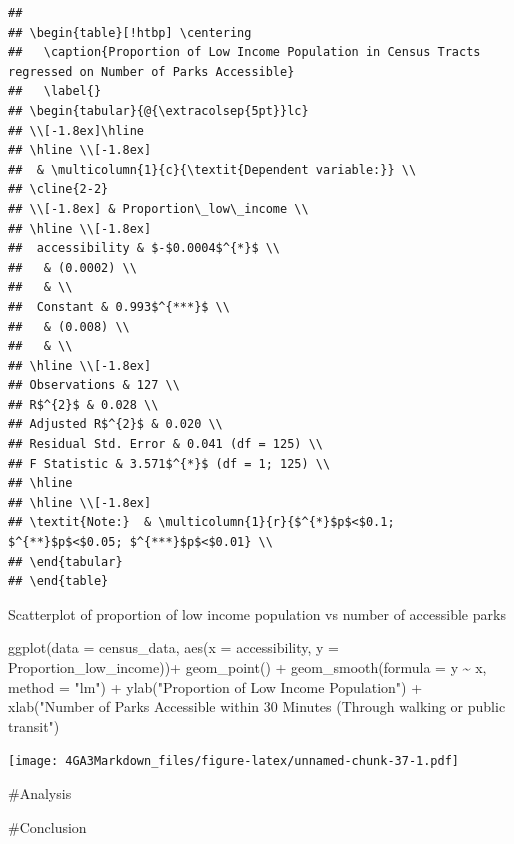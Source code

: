 \documentclass[
]{article}
\newenvironment{Shaded}{\begin{snugshade}}{\end{snugshade}}
\newcommand{\AttributeTok}[1]{\textcolor[rgb]{0.77,0.63,0.00}{#1}}
\newcommand{\FunctionTok}[1]{\textcolor[rgb]{0.00,0.00,0.00}{#1}}
\newcommand{\NormalTok}[1]{#1}
\newcommand{\SpecialCharTok}[1]{\textcolor[rgb]{0.00,0.00,0.00}{#1}}
\newcommand{\StringTok}[1]{\textcolor[rgb]{0.31,0.60,0.02}{#1}}
\begin{document}
\begin{verbatim}
## 
## \begin{table}[!htbp] \centering 
##   \caption{Proportion of Low Income Population in Census Tracts regressed on Number of Parks Accessible} 
##   \label{} 
## \begin{tabular}{@{\extracolsep{5pt}}lc} 
## \\[-1.8ex]\hline 
## \hline \\[-1.8ex] 
##  & \multicolumn{1}{c}{\textit{Dependent variable:}} \\ 
## \cline{2-2} 
## \\[-1.8ex] & Proportion\_low\_income \\ 
## \hline \\[-1.8ex] 
##  accessibility & $-$0.0004$^{*}$ \\ 
##   & (0.0002) \\ 
##   & \\ 
##  Constant & 0.993$^{***}$ \\ 
##   & (0.008) \\ 
##   & \\ 
## \hline \\[-1.8ex] 
## Observations & 127 \\ 
## R$^{2}$ & 0.028 \\ 
## Adjusted R$^{2}$ & 0.020 \\ 
## Residual Std. Error & 0.041 (df = 125) \\ 
## F Statistic & 3.571$^{*}$ (df = 1; 125) \\ 
## \hline 
## \hline \\[-1.8ex] 
## \textit{Note:}  & \multicolumn{1}{r}{$^{*}$p$<$0.1; $^{**}$p$<$0.05; $^{***}$p$<$0.01} \\ 
## \end{tabular} 
## \end{table}
\end{verbatim}

Scatterplot of proportion of low income population vs number of
accessible parks

\begin{Shaded}
\begin{Highlighting}[]
\FunctionTok{ggplot}\NormalTok{(}\AttributeTok{data =}\NormalTok{ census\_data, }
       \FunctionTok{aes}\NormalTok{(}\AttributeTok{x =}\NormalTok{ accessibility, }
           \AttributeTok{y =}\NormalTok{ Proportion\_low\_income))}\SpecialCharTok{+}
  \FunctionTok{geom\_point}\NormalTok{() }\SpecialCharTok{+}
  \FunctionTok{geom\_smooth}\NormalTok{(}\AttributeTok{formula =}\NormalTok{ y }\SpecialCharTok{\textasciitilde{}}\NormalTok{ x,}
              \AttributeTok{method =} \StringTok{"lm"}\NormalTok{) }\SpecialCharTok{+}
  \FunctionTok{ylab}\NormalTok{(}\StringTok{"Proportion of Low Income Population"}\NormalTok{) }\SpecialCharTok{+}
  \FunctionTok{xlab}\NormalTok{(}\StringTok{"Number of Parks Accessible within 30 Minutes (Through walking or public transit"}\NormalTok{) }
\end{Highlighting}
\end{Shaded}

\texttt{[image: 4GA3Markdown\_files/figure-latex/unnamed-chunk-37-1.pdf]}

\#Analysis

\#Conclusion
\end{document}
